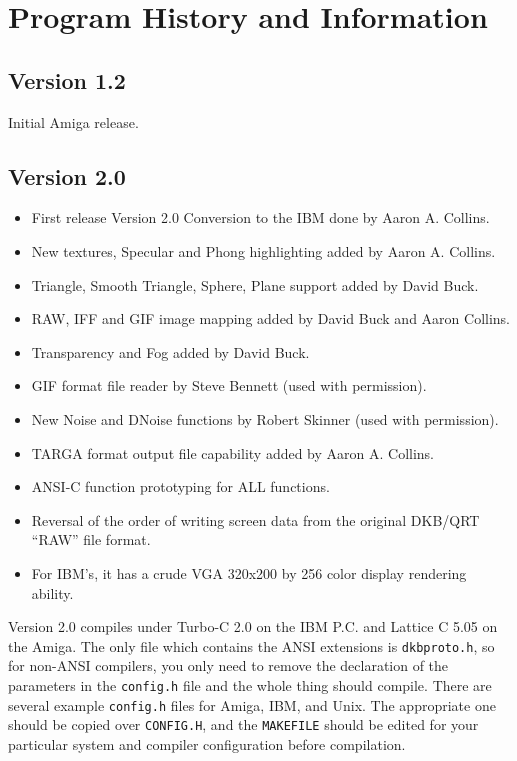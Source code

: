\chapter{Program History and Information}

\section*{Version 1.2}

Initial Amiga release.

\section*{Version 2.0}

\begin{itemize}
\item First release Version 2.0 Conversion to the IBM done by Aaron A. Collins.
\item New textures, Specular and Phong highlighting added by Aaron A. Collins.
\item Triangle, Smooth Triangle, Sphere, Plane support added by David Buck.
\item RAW, IFF and GIF image mapping added by David Buck and Aaron Collins.
\item Transparency and Fog added by David Buck.
\item GIF format file reader by Steve Bennett
(used with permission).
\item New Noise and DNoise functions by Robert Skinner
(used with permission).
\item TARGA format output file capability added by Aaron A. Collins.
\item ANSI-C function prototyping for ALL functions.
\item Reversal of the order of writing screen data from the original DKB/QRT
``RAW'' file format.
\item For IBM's, it has a crude VGA 320x200 by 256 color display rendering
ability.
\end{itemize}

Version 2.0 compiles under Turbo-C 2.0 on the IBM P.C. and Lattice C
5.05 on the Amiga.  The only file which contains the ANSI extensions
is {\tt dkbproto.h}, so for non-ANSI compilers, you only need to remove the
declaration of the parameters in the {\tt config.h} file and the whole thing
should compile.  There are several example {\tt config.h} files for Amiga,
IBM, and Unix.  The appropriate one should be copied over {\tt CONFIG.H},
and the {\tt MAKEFILE} should be edited for your particular system and
compiler configuration before compilation. 
    
